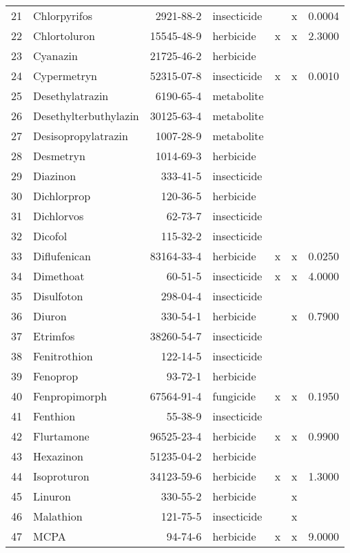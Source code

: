 \begin{longtable}{lp{3cm}rlp{0.5cm}p{0.5cm}p{1.5cm}}
  21 & Chlorpyrifos & 2921-88-2 & insecticide &  & x & 0.0004 \\ 
  22 & Chlortoluron & 15545-48-9 & herbicide & x & x & 2.3000 \\ 
  23 & Cyanazin & 21725-46-2 & herbicide &  &  &  \\ 
  24 & Cypermetryn & 52315-07-8 & insecticide & x & x & 0.0010 \\ 
  25 & Desethylatrazin & 6190-65-4 & metabolite &  &  &  \\ 
  26 & Desethylterbuthylazin & 30125-63-4 & metabolite &  &  &  \\ 
  27 & Desisopropylatrazin & 1007-28-9 & metabolite &  &  &  \\ 
  28 & Desmetryn & 1014-69-3 & herbicide &  &  &  \\ 
  29 & Diazinon & 333-41-5 & insecticide &  &  &  \\ 
  30 & Dichlorprop & 120-36-5 & herbicide &  &  &  \\ 
  31 & Dichlorvos & 62-73-7 & insecticide &  &  &  \\ 
  32 & Dicofol & 115-32-2 & insecticide &  &  &  \\ 
  33 & Diflufenican & 83164-33-4 & herbicide & x & x & 0.0250 \\ 
  34 & Dimethoat & 60-51-5 & insecticide & x & x & 4.0000 \\ 
  35 & Disulfoton & 298-04-4 & insecticide &  &  &  \\ 
  36 & Diuron & 330-54-1 & herbicide &  & x & 0.7900 \\ 
  37 & Etrimfos & 38260-54-7 & insecticide &  &  &  \\ 
  38 & Fenitrothion & 122-14-5 & insecticide &  &  &  \\ 
  39 & Fenoprop & 93-72-1 & herbicide &  &  &  \\ 
  40 & Fenpropimorph & 67564-91-4 & fungicide & x & x & 0.1950 \\ 
  41 & Fenthion & 55-38-9 & insecticide &  &  &  \\ 
  42 & Flurtamone & 96525-23-4 & herbicide & x & x & 0.9900 \\ 
  43 & Hexazinon & 51235-04-2 & herbicide &  &  &  \\ 
  44 & Isoproturon & 34123-59-6 & herbicide & x & x & 1.3000 \\ 
  45 & Linuron & 330-55-2 & herbicide &  & x &  \\ 
  46 & Malathion & 121-75-5 & insecticide &  & x &  \\ 
  47 & MCPA & 94-74-6 & herbicide & x & x & 9.0000 \\ 

\end{longtable}
